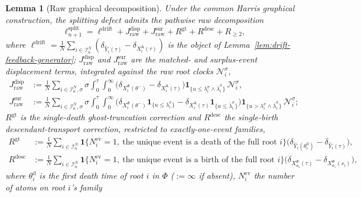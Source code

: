 \documentclass[a4paper,fleqn]{cas-sc}
\newtheorem{lemma}[theorem]{Lemma}
\theoremstyle{definition}
\theoremstyle{remark}
\begin{document}
\begin{lemma}[Raw graphical decomposition]\label{lem:raw-split-decomp}
Under the common Harris graphical construction, the splitting defect admits the
pathwise raw decomposition
\begin{equation}\label{eq:raw-decomp}
\ell^{\mathrm{split}}_{n+1}
=\ell^{\mathrm{drift}}+J^{\mathrm{disp}}_{\mathrm{raw}}+J^{\mathrm{sur}}_{\mathrm{raw}}
+R^{\mathrm{gt}}+R^{\mathrm{desc}}+R_{\ge2},
\end{equation}
where $\ell^{\mathrm{drift}}=\frac1N\sum_{i\in\mathcal I^N_n}(\delta_{\widehat Y_i(\tau)}-\delta_{X^{\mathsf A}_i(\tau)})$
is the object of Lemma~\ref{lem:drift-feedback-generator}; $J^{\mathrm{disp}}_{\mathrm{raw}}$
and $J^{\mathrm{sur}}_{\mathrm{raw}}$ are the matched- and surplus-event displacement terms,
integrated against the \emph{raw} root clocks $\mathcal N^\sigma_i$,
\begin{align}
J^{\mathrm{disp}}_{\mathrm{raw}}
&:=\frac1N\sum_{i\in\mathcal I^N_n,\sigma}\sigma\!\int_0^\tau\!\!\!\int_0^\infty\!
\bigl(\delta_{X^\Phi_i(\theta^-)}-\delta_{X^{\mathsf A}_i(\tau)}\bigr)
\mathbf 1_{\{u\le\lambda^\sigma_i\wedge\bar\lambda^\sigma_i\}}\,\mathcal N^\sigma_i,
\label{eq:Jdisp-def}\\
J^{\mathrm{sur}}_{\mathrm{raw}}
&:=\frac1N\sum_{i\in\mathcal I^N_n,\sigma}\sigma\!\int_0^\tau\!\!\!\int_0^\infty\!
\bigl(\delta_{X^\Phi_i(\theta^-)}\mathbf 1_{\{u\le\lambda^\sigma_i\}}
-\delta_{X^{\mathsf A}_i(\tau)}\mathbf 1_{\{u\le\bar\lambda^\sigma_i\}}\bigr)
\mathbf 1_{\{u>\lambda^\sigma_i\wedge\bar\lambda^\sigma_i\}}\,\mathcal N^\sigma_i;
\label{eq:Jsur-def}
\end{align}
$R^{\mathrm{gt}}$ is the single-death ghost-truncation correction and $R^{\mathrm{desc}}$
the single-birth descendant-transport correction, restricted to exactly-one-event
families,
\begin{align}
R^{\mathrm{gt}}
&:=\frac1N\sum_{i\in\mathcal I^N_n}\mathbf 1\{N^{\mathrm{ev}}_i=1,\ \text{the unique event is a death of the full root }i\}
\bigl(\delta_{\widehat Y_i(\theta^{\mathrm d}_i)}-\delta_{\widehat Y_i(\tau)}\bigr),
\label{eq:Rgt-def}\\
R^{\mathrm{desc}}
&:=\frac1N\sum_{i\in\mathcal I^N_n}\mathbf 1\{N^{\mathrm{ev}}_i=1,\ \text{the unique event is a birth of the full root }i\}
\bigl(\delta_{X^\Phi_{\alpha_i}(\tau)}-\delta_{X^\Phi_{\alpha_i}(s_i)}\bigr),
\label{eq:Rdesc-def}
\end{align}
where $\theta^{\mathrm d}_i$ is the first death time of root $i$ in $\Phi$
($:=\infty$ if absent), $N^{\mathrm{ev}}_i$ the number of atoms on root $i$'s family

\end{lemma}
\end{document}
